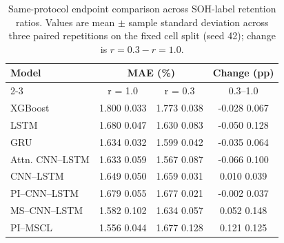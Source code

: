 \begin{table}[htbp]
\caption{Same-protocol endpoint comparison across SOH-label retention ratios. Values are mean $\pm$ sample standard deviation across three paired repetitions on the fixed cell split (seed 42); change is $r=0.3-r=1.0$.}
\label{tab:all_models_endpoint_budget}
\centering
\setlength{\tabcolsep}{3.0pt}
\begin{tabular*}{\textwidth}{@{\extracolsep{\fill}}lccc@{}}
\toprule
Model & \multicolumn{2}{c}{MAE (\%)} & Change (pp) \\
\cmidrule(lr){2-3}
 & r = 1.0 & r = 0.3 & 0.3--1.0 \\
\midrule
XGBoost & 1.800 \textpm{} 0.033 & 1.773 \textpm{} 0.038 & -0.028 \textpm{} 0.067 \\
LSTM & 1.680 \textpm{} 0.047 & 1.630 \textpm{} 0.083 & -0.050 \textpm{} 0.128 \\
GRU & 1.634 \textpm{} 0.032 & 1.599 \textpm{} 0.042 & -0.035 \textpm{} 0.064 \\
Attn. CNN--LSTM & 1.633 \textpm{} 0.059 & 1.567 \textpm{} 0.087 & -0.066 \textpm{} 0.100 \\
CNN--LSTM & 1.649 \textpm{} 0.050 & 1.659 \textpm{} 0.031 & 0.010 \textpm{} 0.039 \\
PI--CNN--LSTM & 1.679 \textpm{} 0.055 & 1.677 \textpm{} 0.021 & -0.002 \textpm{} 0.037 \\
MS--CNN--LSTM & 1.582 \textpm{} 0.102 & 1.634 \textpm{} 0.057 & 0.052 \textpm{} 0.148 \\
PI--MSCL & 1.556 \textpm{} 0.044 & 1.677 \textpm{} 0.128 & 0.121 \textpm{} 0.125 \\
\bottomrule
\end{tabular*}
\end{table}
